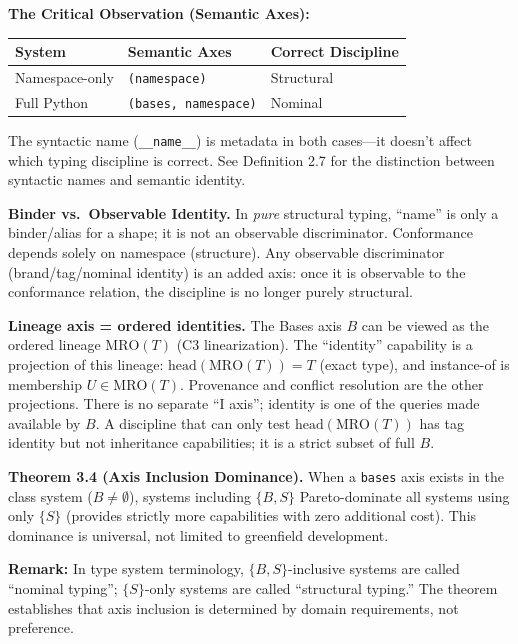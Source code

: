 \textbf{The Critical Observation (Semantic Axes):}

\small
\begin{longtable}[]{@{}lll@{}}
\toprule\noalign{}
System & Semantic Axes & Correct Discipline \\
\midrule\noalign{}
\endhead
\bottomrule\noalign{}
\endlastfoot
Namespace-only & \texttt{(namespace)} & Structural \\
Full Python & \texttt{(bases,\ namespace)} & Nominal \\
\end{longtable}

The syntactic name (\texttt{\_\_name\_\_}) is metadata in both cases---it doesn't affect
which typing discipline is correct. See Definition 2.7 for the distinction between syntactic names and semantic identity.

\textbf{Binder vs.~Observable Identity.} In \emph{pure} structural
typing, ``name'' is only a binder/alias for a shape; it is not an
observable discriminator. Conformance depends solely on namespace
(structure). Any observable discriminator (brand/tag/nominal identity)
is an added axis: once it is observable to the conformance relation, the
discipline is no longer purely structural.

\textbf{Lineage axis = ordered identities.} The Bases axis \(B\) can be
viewed as the ordered lineage \(\text{MRO}(T)\) (C3 linearization). The
``identity'' capability is a projection of this lineage:
\(\text{head}(\text{MRO}(T)) = T\) (exact type), and instance-of is
membership \(U \in \text{MRO}(T)\). Provenance and conflict resolution
are the other projections. There is no separate ``I axis''; identity is
one of the queries made available by \(B\). A discipline that can only
test \(\text{head}(\text{MRO}(T))\) has tag identity but not inheritance
capabilities; it is a strict subset of full \(B\).

\textbf{Theorem 3.4 (Axis Inclusion Dominance).} When a
\texttt{bases} axis exists in the class system ($B \neq \emptyset$), systems including $\{B, S\}$
Pareto-dominate all systems using only $\{S\}$ (provides strictly more
capabilities with zero additional cost). This dominance is
universal, not limited to greenfield development.

\textbf{Remark:} In type system terminology, $\{B, S\}$-inclusive systems are called ``nominal typing''; $\{S\}$-only systems are called ``structural typing.'' The theorem establishes that axis inclusion is determined by domain requirements, not preference.


